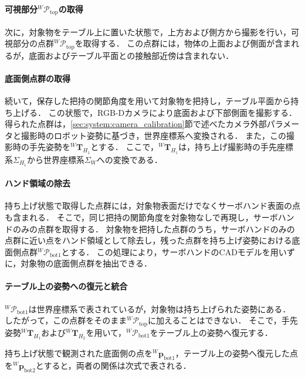 \paragraph{可視部分${}^{W}\mathcal{P}_{\mathrm{top}}$の取得}
次に，対象物をテーブル上に置いた状態で，上方および側方から撮影を行い，可視部分の点群${}^{W}\mathcal{P}_{\mathrm{top}}$を取得する．
この点群には，物体の上面および側面が含まれるが，底面およびテーブル平面との接触部近傍は含まれない．

\paragraph{底面側点群の取得}
続いて，保存した把持の関節角度を用いて対象物を把持し，テーブル平面から持ち上げる．
この状態で，RGB-Dカメラにより底面および下部側面を撮影する．
得られた点群は，\ref{sec:system:camera_calibration}節で述べたカメラ外部パラメータと撮影時のロボット姿勢に基づき，世界座標系へ変換される．
また，この撮影時の手先姿勢を${}^{W}\bm{T}_{H_1}$とする．
ここで，${}^{W}\bm{T}_{H_1}$は，持ち上げ撮影時の手先座標系$\Sigma_{H_1}$から世界座標系$\Sigma_W$への変換である．

\paragraph{ハンド領域の除去}
持ち上げ状態で取得した点群には，対象物表面だけでなくサーボハンド表面の点も含まれる．
そこで，同じ把持の関節角度を対象物なしで再現し，サーボハンドのみの点群を取得する．
対象物を把持した点群のうち，サーボハンドのみの点群に近い点をハンド領域として除去し，残った点群を持ち上げ姿勢における底面側点群${}^{W}\mathcal{P}_{\mathrm{bot1}}$とする．
この処理により，サーボハンドのCADモデルを用いずに，対象物の底面側点群を抽出できる．

\paragraph{テーブル上の姿勢への復元と統合}
${}^{W}\mathcal{P}_{\mathrm{bot1}}$は世界座標系で表されているが，対象物は持ち上げられた姿勢にある．
したがって，この点群をそのまま${}^{W}\mathcal{P}_{\mathrm{top}}$に加えることはできない．
そこで，手先姿勢${}^{W}\bm{T}_{H_1}$および${}^{W}\bm{T}_{H_2}$を用いて，${}^{W}\mathcal{P}_{\mathrm{bot1}}$をテーブル上の姿勢へ復元する．

持ち上げ状態で観測された底面側の点を${}^{W}\bm{p}_{\mathrm{bot1}}$，テーブル上の姿勢へ復元した点を${}^{W}\bm{p}_{\mathrm{bot2}}$とすると，両者の関係は次式で表される．

